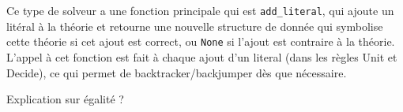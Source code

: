 \documentclass{article}
\begin{document}
Ce type de solveur a une fonction principale qui est \texttt{add\_literal}, qui
ajoute un litéral à la théorie et retourne une nouvelle structure de donnée qui
symbolise cette théorie si cet ajout est correct, ou \texttt{None} si l'ajout
est contraire à la théorie. L'appel à cet fonction est fait à chaque ajout d'un
literal (dans les règles Unit et Decide), ce qui permet de
backtracker/backjumper dès que nécessaire.

\medskip

Explication sur égalité ?
\end{document}
